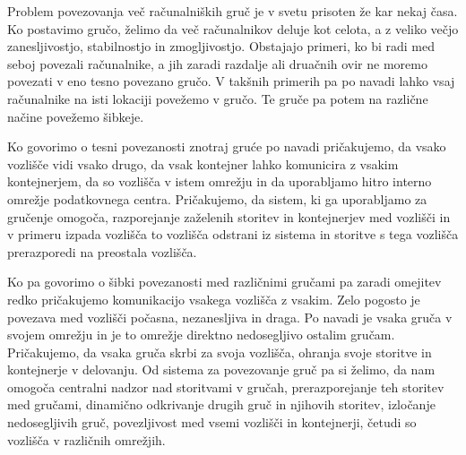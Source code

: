 \documentclass[a4paper, 12pt]{book}
\begin{document}
Problem povezovanja več računalniških gruč je v svetu prisoten že kar nekaj časa.
Ko postavimo gručo, želimo da več računalnikov deluje kot celota, a z veliko večjo zanesljivostjo, stabilnostjo in zmogljivostjo.
Obstajajo primeri, ko bi radi med seboj povezali računalnike, a jih zaradi razdalje ali druačnih ovir ne moremo povezati v eno tesno povezano gručo.
V takšnih primerih pa po navadi lahko vsaj računalnike na isti lokaciji povežemo v gručo.
Te gruče pa potem na različne načine povežemo šibkeje.

Ko govorimo o tesni povezanosti znotraj gruće po navadi pričakujemo, da vsako vozlišče vidi vsako drugo, da vsak kontejner lahko komunicira z vsakim kontejnerjem, da so vozlišča v istem omrežju in da uporabljamo hitro interno omrežje podatkovnega centra. 
Pričakujemo, da sistem, ki ga uporabljamo za gručenje omogoča, razporejanje zaželenih storitev in kontejnerjev med vozlišči in v primeru izpada vozlišča to vozlišča odstrani iz sistema in storitve s tega vozlišča prerazporedi na preostala vozlišča.

Ko pa govorimo o šibki povezanosti med različnimi gručami pa zaradi omejitev redko pričakujemo komunikacijo vsakega vozlišča z vsakim.
Zelo pogosto je povezava med vozlišči počasna, nezanesljiva in draga.
Po navadi je vsaka gruča v svojem omrežju in je to omrežje direktno nedosegljivo ostalim gručam.
Pričakujemo, da vsaka gruča skrbi za svoja vozlišča, ohranja svoje storitve in kontejnerje v delovanju.
Od sistema za povezovanje gruč pa si želimo, da nam omogoča centralni nadzor nad storitvami v gručah, prerazporejanje teh storitev med gručami, dinamično odkrivanje drugih gruč in njihovih storitev, izločanje nedosegljivih gruč, povezljivost med vsemi vozlišči in kontejnerji, četudi so vozlišča v različnih omrežjih.
\end{document}
